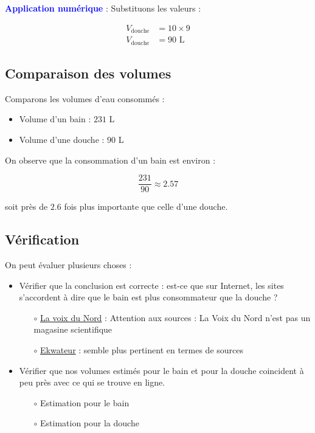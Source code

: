 \documentclass[a4paper,12pt]{article}
\begin{document}
\textbf{\textcolor{blue}{Application numérique}} : 
\vspace{1em}
Substituons les valeurs :

\begin{align}
  V_{\text{douche}} &= 10 \times 9 \\
  V_{\text{douche}} &= 90 \text{ L}
\end{align}

\subsection*{Comparaison des volumes}

Comparons les volumes d'eau consommés :
\begin{itemize}[noitemsep]
    \item Volume d'un bain : $231$ L
    \item Volume d'une douche : $90$ L
\end{itemize}

On observe que la consommation d'un bain est environ :

\begin{equation}
    \frac{231}{90} \approx 2.57
\end{equation}

soit près de $2.6$ fois plus importante que celle d'une douche.

\subsection*{Vérification}

On peut évaluer plusieurs choses : 
\begin{itemize}[noitemsep]
  \item Vérifier que la conclusion est correcte : est-ce que sur Internet, les sites s'accordent à dire que le bain est plus consommateur que la douche ?
  \begin{itemize}[noitemsep] 
    \item[$\circ$] \href{https://www.lavoixdunord.fr/566304/article/2019-04-10/un-bain-consomme-cinq-fois-plus-d-eau-qu-une-douche}{La voix du Nord} : Attention aux sources : La Voix du Nord n'est pas un magasine scientifique
    \item[$\circ$] \href{https://ekwateur.fr/blog/ma-consommation-d-energie/consommation-bain/}{Ekwateur} : semble plus pertinent en termes de sources
  \end{itemize}
  \item Vérifier que nos volumes estimés pour le bain et pour la douche coincident à peu près avec ce qui se trouve en ligne.
  \begin{itemize}[noitemsep] 
    \item[$\circ$] Estimation pour le bain
    \item[$\circ$] Estimation pour la douche
  \end{itemize}
\end{itemize}
\end{document}
